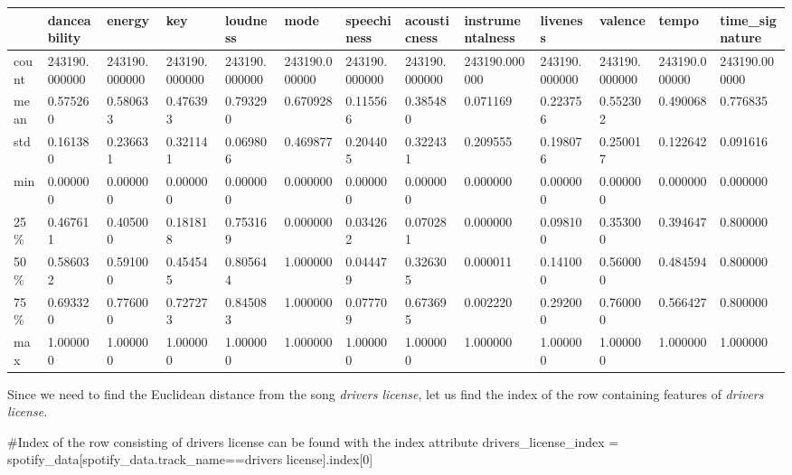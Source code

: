 \documentclass[
  letterpaper,
  DIV=11,
  numbers=noendperiod]{scrreprt}
\newenvironment{Shaded}{\begin{snugshade}}{\end{snugshade}}
\newcommand{\CommentTok}[1]{\textcolor[rgb]{0.37,0.37,0.37}{#1}}
\newcommand{\DecValTok}[1]{\textcolor[rgb]{0.68,0.00,0.00}{#1}}
\newcommand{\NormalTok}[1]{\textcolor[rgb]{0.00,0.23,0.31}{#1}}
\newcommand{\OperatorTok}[1]{\textcolor[rgb]{0.37,0.37,0.37}{#1}}
\newcommand{\StringTok}[1]{\textcolor[rgb]{0.13,0.47,0.30}{#1}}
\begin{document}
\begin{longtable}[]{@{}lllllllllllll@{}}
\toprule\noalign{}
& danceability & energy & key & loudness & mode & speechiness &
acousticness & instrumentalness & liveness & valence & tempo &
time\_signature \\
\midrule\noalign{}
\endhead
\bottomrule\noalign{}
\endlastfoot
count & 243190.000000 & 243190.000000 & 243190.000000 & 243190.000000 &
243190.000000 & 243190.000000 & 243190.000000 & 243190.000000 &
243190.000000 & 243190.000000 & 243190.000000 & 243190.000000 \\
mean & 0.575260 & 0.580633 & 0.476393 & 0.793290 & 0.670928 & 0.115566 &
0.385480 & 0.071169 & 0.223756 & 0.552302 & 0.490068 & 0.776835 \\
std & 0.161380 & 0.236631 & 0.321141 & 0.069806 & 0.469877 & 0.204405 &
0.322431 & 0.209555 & 0.198076 & 0.250017 & 0.122642 & 0.091616 \\
min & 0.000000 & 0.000000 & 0.000000 & 0.000000 & 0.000000 & 0.000000 &
0.000000 & 0.000000 & 0.000000 & 0.000000 & 0.000000 & 0.000000 \\
25\% & 0.467611 & 0.405000 & 0.181818 & 0.753169 & 0.000000 & 0.034262 &
0.070281 & 0.000000 & 0.098100 & 0.353000 & 0.394647 & 0.800000 \\
50\% & 0.586032 & 0.591000 & 0.454545 & 0.805644 & 1.000000 & 0.044479 &
0.326305 & 0.000011 & 0.141000 & 0.560000 & 0.484594 & 0.800000 \\
75\% & 0.693320 & 0.776000 & 0.727273 & 0.845083 & 1.000000 & 0.077709 &
0.673695 & 0.002220 & 0.292000 & 0.760000 & 0.566427 & 0.800000 \\
max & 1.000000 & 1.000000 & 1.000000 & 1.000000 & 1.000000 & 1.000000 &
1.000000 & 1.000000 & 1.000000 & 1.000000 & 1.000000 & 1.000000 \\
\end{longtable}

Since we need to find the Euclidean distance from the song \emph{drivers
license}, let us find the index of the row containing features of
\emph{drivers license.}

\begin{Shaded}
\begin{Highlighting}[]
\CommentTok{\#Index of the row consisting of drivers license can be found with the index attribute}
\NormalTok{drivers\_license\_index }\OperatorTok{=}\NormalTok{ spotify\_data[spotify\_data.track\_name}\OperatorTok{==}\StringTok{\textquotesingle{}drivers license\textquotesingle{}}\NormalTok{].index[}\DecValTok{0}\NormalTok{]}
\end{Highlighting}
\end{Shaded}
\end{document}
